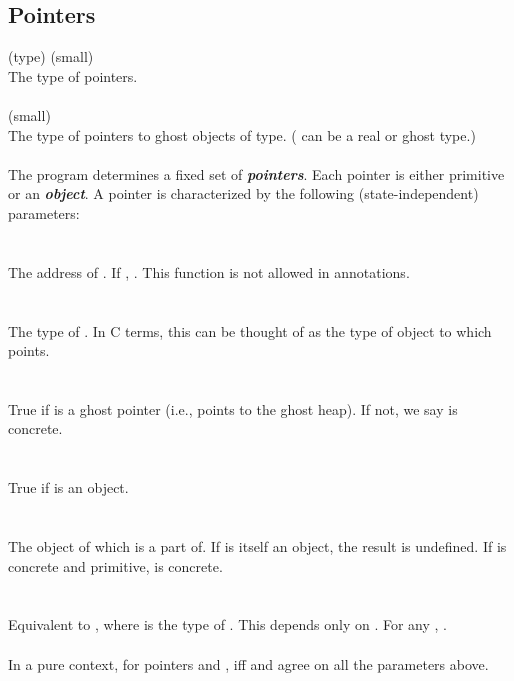 \documentclass[preprint,nocopyrightspace]{sigplanconf}
\newcommand{\Def}[1]{\textit{\textbf{#1}}}
\begin{document}
{{\subsection{Pointers}

\vcc{\object} (type) (small)\\
The type of pointers.
\\\\
 (small)\\
The type of pointers to ghost objects of type. ( can be a real or ghost type.)
\\\\
The program determines a fixed set of \Def{pointers}.  Each
pointer is either primitive or an \Def{object}. 
A pointer is characterized by the following (state-independent) parameters:
\\\\
\\
The address of . If , 
.
This function is not allowed in annotations.
\\\\
\\
The type of . In C terms, this can be thought of as the type of
object to which  points.
\\\\
\\
True if  is a ghost pointer (i.e., points to the ghost
heap). If not, we say  is concrete. 
\\\\
\\
True if  is an object. 
\\\\
\\
The object of which  is a part of. If  is itself an object, the
result is undefined. If  is concrete and
primitive,  is concrete.
\\\\
\\
Equivalent to , where  is the type
of . This depends only on . For any , 
.
\\\\
In a pure context, for pointers  and , 
iff  and  agree on all the parameters above.

}}
\end{document}
